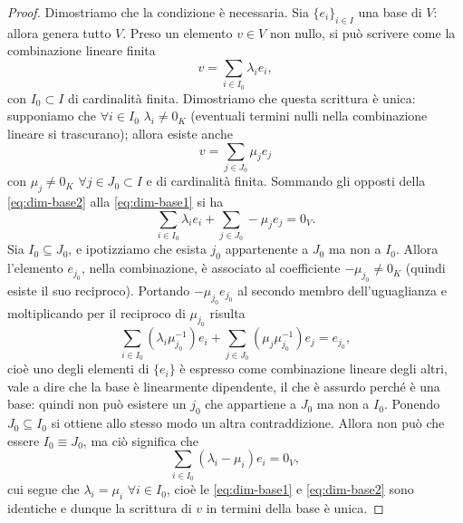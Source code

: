 \begin{proof}
	Dimostriamo che la condizione è necessaria.
	Sia $\{  e_i\}_{i\in I}$ una base di $V$: allora genera tutto $V$.
	Preso un elemento $  v\in V$ non nullo, si può scrivere come la combinazione lineare finita
	\begin{equation} \label{eq:dim-base1}
		  v=\sum_{i\in I_0}\lambda_i  e_i,
	\end{equation}
	con $I_0\subset I$ di cardinalità finita.
	Dimostriamo che questa scrittura è unica: supponiamo che $\forall i\in I_0$ $\lambda_i\neq 0_K$ (eventuali termini nulli nella combinazione lineare si trascurano); allora esiste anche 
	\begin{equation} \label{eq:dim-base2}
		  v=\sum_{j\in J_0}\mu_j  e_j
	\end{equation}
	con $\mu_j\neq 0_K$ $\forall j\in J_0\subset I$ e di cardinalità finita.
	Sommando gli opposti della \eqref{eq:dim-base2} alla \eqref{eq:dim-base1} si ha
	\begin{equation*}
		\sum_{i\in I_0}\lambda_i  e_i+\sum_{j\in J_0}-\mu_j  e_j=0_V.
	\end{equation*}
	Sia $I_0\subseteq J_0$, e ipotizziamo che esista $j_0$ appartenente a $J_0$ ma non a $I_0$.
	Allora l'elemento $  e_{j_0}$, nella combinazione, è associato al coefficiente $-\mu_{j_0}\neq 0_K$ (quindi esiste il suo reciproco).
	Portando $-\mu_{j_0}  e_{j_0}$ al secondo membro dell'uguaglianza e moltiplicando per il reciproco di $\mu_{j_0}$ risulta
	\begin{equation*}
		\sum_{i\in I_0}(\lambda_i\mu_{j_0}^{-1})  e_i+\sum_{j\in J_0}(\mu_j\mu_{j_0}^{-1})  e_j=  e_{j_0},
	\end{equation*}
	cioè uno degli elementi di $\{  e_i\}$ è espresso come combinazione lineare degli altri, vale a dire che la base è linearmente dipendente, il che è assurdo perché è una base: quindi non può esistere un $j_0$ che appartiene a $J_0$ ma non a $I_0$.
	Ponendo $J_0\subseteq I_0$ si ottiene allo stesso modo un altra contraddizione.
	Allora non può che essere $I_0\equiv J_0$, ma ciò significa che
	\begin{equation*}
		\sum_{i\in I_0}(\lambda_i-\mu_i)  e_i=0_V,
	\end{equation*}
	cui segue che $\lambda_i=\mu_i$ $\forall i\in I_0$, cioè le \eqref{eq:dim-base1} e \eqref{eq:dim-base2} sono identiche e dunque la scrittura di $  v$ in termini della base è unica.


\end{proof}
